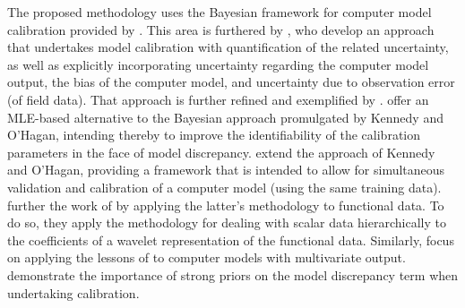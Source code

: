\documentclass{article}
\begin{document}
The proposed methodology uses the Bayesian framework for computer model calibration provided by  \cite{Kennedy2001}.
% 
This area is furthered by \cite{Higdon2004}, who develop an approach that undertakes model calibration with quantification of the related uncertainty, as well as explicitly incorporating uncertainty regarding the computer model output, the bias of the computer model, and uncertainty due to observation error (of field data). 
%
That approach is further refined and exemplified by \cite{Williams2006}.
\cite{Loeppky2006} offer an MLE-based alternative to the Bayesian approach promulgated by Kennedy and O'Hagan, intending thereby to improve the identifiability of the calibration parameters in the face of model discrepancy. 
\cite{Bayarri2007} extend the approach of Kennedy and O'Hagan, providing a framework that is intended to allow for simultaneous validation and calibration of a computer model (using the same training data). 
\cite{Bayarri} further the work of \cite{Bayarri2007} by applying the latter's methodology to functional data. 
To do so, they apply the methodology for dealing with scalar data hierarchically to the coefficients of a wavelet representation of the functional data. 
Similarly, \cite{Paulo2012} focus on applying the lessons of \cite{Bayarri2007} to computer models with multivariate output.
\cite{Brynjarsdottir2014} demonstrate the importance of strong priors on the model discrepancy term when undertaking calibration.

\end{document}

